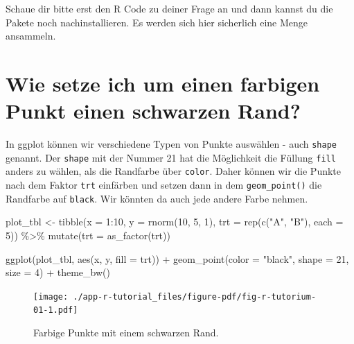 \documentclass[
  letterpaper,
]{scrbook}
\newenvironment{Shaded}{\begin{snugshade}}{\end{snugshade}}
\newcommand{\AttributeTok}[1]{\textcolor[rgb]{0.40,0.45,0.13}{#1}}
\newcommand{\DecValTok}[1]{\textcolor[rgb]{0.68,0.00,0.00}{#1}}
\newcommand{\FunctionTok}[1]{\textcolor[rgb]{0.28,0.35,0.67}{#1}}
\newcommand{\NormalTok}[1]{\textcolor[rgb]{0.00,0.23,0.31}{#1}}
\newcommand{\OtherTok}[1]{\textcolor[rgb]{0.00,0.23,0.31}{#1}}
\newcommand{\SpecialCharTok}[1]{\textcolor[rgb]{0.37,0.37,0.37}{#1}}
\newcommand{\StringTok}[1]{\textcolor[rgb]{0.13,0.47,0.30}{#1}}
\begin{document}
Schaue dir bitte erst den R Code zu deiner Frage an und dann kannst du
die Pakete noch nachinstallieren. Es werden sich hier sicherlich eine
Menge ansammeln.

\hypertarget{sec-black-circle-point}{%
\section{Wie setze ich um einen farbigen Punkt einen schwarzen
Rand?}\label{sec-black-circle-point}}

In ggplot können wir verschiedene Typen von Punkte auswählen - auch
\texttt{shape} genannt. Der \texttt{shape} mit der Nummer 21 hat die
Möglichkeit die Füllung \texttt{fill} anders zu wählen, als die
Randfarbe über \texttt{color}. Daher können wir die Punkte nach dem
Faktor \texttt{trt} einfärben und setzen dann in dem
\texttt{geom\_point()} die Randfarbe auf \texttt{black}. Wir könnten da
auch jede andere Farbe nehmen.

\begin{Shaded}
\begin{Highlighting}[]
\NormalTok{plot\_tbl }\OtherTok{\textless{}{-}} \FunctionTok{tibble}\NormalTok{(}\AttributeTok{x =} \DecValTok{1}\SpecialCharTok{:}\DecValTok{10}\NormalTok{,}
                   \AttributeTok{y =} \FunctionTok{rnorm}\NormalTok{(}\DecValTok{10}\NormalTok{, }\DecValTok{5}\NormalTok{, }\DecValTok{1}\NormalTok{),}
                   \AttributeTok{trt =} \FunctionTok{rep}\NormalTok{(}\FunctionTok{c}\NormalTok{(}\StringTok{"A"}\NormalTok{, }\StringTok{"B"}\NormalTok{), }\AttributeTok{each =} \DecValTok{5}\NormalTok{)) }\SpecialCharTok{\%\textgreater{}\%} 
  \FunctionTok{mutate}\NormalTok{(}\AttributeTok{trt =}  \FunctionTok{as\_factor}\NormalTok{(trt))}

\FunctionTok{ggplot}\NormalTok{(plot\_tbl, }\FunctionTok{aes}\NormalTok{(x, y, }\AttributeTok{fill =}\NormalTok{ trt)) }\SpecialCharTok{+}
  \FunctionTok{geom\_point}\NormalTok{(}\AttributeTok{color =} \StringTok{"black"}\NormalTok{, }\AttributeTok{shape =} \DecValTok{21}\NormalTok{, }\AttributeTok{size =} \DecValTok{4}\NormalTok{) }\SpecialCharTok{+}
  \FunctionTok{theme\_bw}\NormalTok{() }
\end{Highlighting}
\end{Shaded}

\begin{figure}[H]

{\centering \texttt{[image: ./app-r-tutorial\_files/figure-pdf/fig-r-tutorium-01-1.pdf]}

}

\caption{\label{fig-r-tutorium-01}Farbige Punkte mit einem schwarzen
Rand.}

\end{figure}
\end{document}
